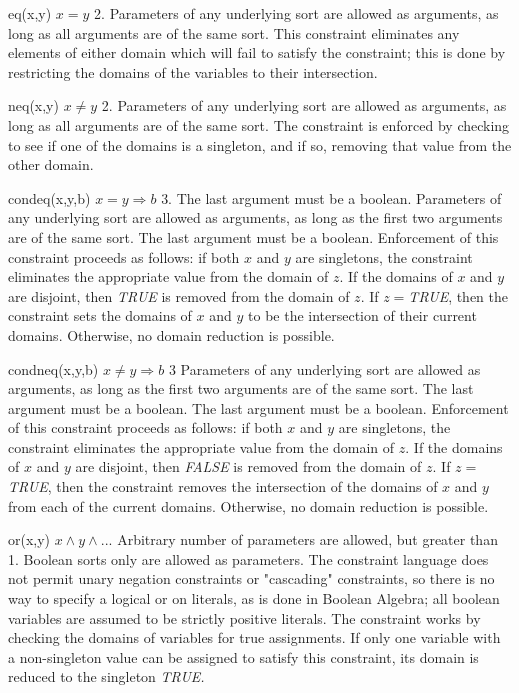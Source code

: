     {eq(x,y)}
    {$x=y$}
    {2.}
    {Parameters of any underlying sort are allowed as arguments, as long as all arguments
    are of the same sort.}
    {This constraint eliminates
    any elements of either domain which will fail to satisfy the constraint;
    this is done by restricting the domains of the variables to their intersection.}

    {neq(x,y)}
    {$x \neq y$}
    {2.}
    {Parameters of any underlying sort are allowed as arguments, as long as all arguments
    are of the same sort.}
    {The constraint is enforced by checking to see if one of the domains is a
    singleton, and if so, removing that value from the other domain.}

    {condeq(x,y,b)}
    {$x=y \Rightarrow b$}
    {3.  The last argument must be a boolean.}
    {Parameters of any underlying sort are allowed as arguments, as long as the first two arguments
    are of the same sort.  The last argument must be a boolean.}
    {Enforcement of this constraint proceeds as follows: if both $x$ and $y$
    are singletons, the constraint eliminates the appropriate value from the
    domain of $z$.  If the domains
    of $x$ and $y$ are disjoint, then {\em TRUE} is removed from the domain of $z$.
    If $z=${\em TRUE}, then
    the constraint sets the domains of $x$ and $y$ to be the intersection
    of their current domains.  Otherwise, no domain reduction is possible.}

    {condneq(x,y,b)}
    {$x \neq y \Rightarrow b$}
    {3}
    {Parameters of any underlying sort are allowed as arguments, as long as the first two arguments
    are of the same sort.  The last argument must be a boolean.}
    {The last argument must be a boolean.  
    Enforcement of this constraint proceeds as follows: if both $x$ and $y$
    are singletons, the constraint eliminates the appropriate value from the
    domain of $z$.  If the domains
    of $x$ and $y$ are disjoint, then {\em FALSE} is removed from the domain of $z$.
    If $z=${\em TRUE}, then
    the constraint removes the intersection of the domains of $x$ and $y$ from
    each of the current domains.  Otherwise, no domain reduction is possible.}

    {or(x,y)}
    {$x \wedge y \wedge ...$}
    {Arbitrary number of parameters are allowed, but greater than 1.}
    {Boolean sorts only are allowed as parameters.}
    {The constraint language does not permit
    unary negation constraints or "cascading" constraints, so there is
    no way to specify a logical or on literals, as is done in Boolean Algebra;
    all boolean variables are assumed to be strictly positive literals.
    The constraint works by checking the domains of variables for
    true assignments.  If only one variable with a non-singleton value can
    be assigned to satisfy this constraint, its domain is reduced to the 
    singleton {\em TRUE.}}

